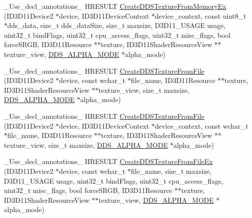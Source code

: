 \begin{DoxyCompactItemize}
\item 
\+\_\+\+Use\+\_\+decl\+\_\+annotations\+\_\+ H\+R\+E\+S\+U\+LT \hyperlink{namespacemage_ad5d3e9d297c74e18a84a3c1d9311e6a9}{Create\+D\+D\+S\+Texture\+From\+Memory\+Ex} (I\+D3\+D11\+Device2 $\ast$device, I\+D3\+D11\+Device\+Context $\ast$device\+\_\+context, const uint8\+\_\+t $\ast$dds\+\_\+data, size\+\_\+t dds\+\_\+data\+Size, size\+\_\+t maxsize, D3\+D11\+\_\+\+U\+S\+A\+GE usage, uint32\+\_\+t bind\+Flags, uint32\+\_\+t cpu\+\_\+access\+\_\+flags, uint32\+\_\+t misc\+\_\+flags, bool force\+S\+R\+GB, I\+D3\+D11\+Resource $\ast$$\ast$texture, I\+D3\+D11\+Shader\+Resource\+View $\ast$$\ast$texture\+\_\+view, \hyperlink{namespacemage_a0c586a2bad862f4858900ca121ca80c2}{D\+D\+S\+\_\+\+A\+L\+P\+H\+A\+\_\+\+M\+O\+DE} $\ast$alpha\+\_\+mode)
\item 
\+\_\+\+Use\+\_\+decl\+\_\+annotations\+\_\+ H\+R\+E\+S\+U\+LT \hyperlink{namespacemage_a3a3965b1c7679947007304baf7ba0cde}{Create\+D\+D\+S\+Texture\+From\+File} (I\+D3\+D11\+Device2 $\ast$device, const wchar\+\_\+t $\ast$file\+\_\+name, I\+D3\+D11\+Resource $\ast$$\ast$texture, I\+D3\+D11\+Shader\+Resource\+View $\ast$$\ast$texture\+\_\+view, size\+\_\+t maxsize, \hyperlink{namespacemage_a0c586a2bad862f4858900ca121ca80c2}{D\+D\+S\+\_\+\+A\+L\+P\+H\+A\+\_\+\+M\+O\+DE} $\ast$alpha\+\_\+mode)
\item 
\+\_\+\+Use\+\_\+decl\+\_\+annotations\+\_\+ H\+R\+E\+S\+U\+LT \hyperlink{namespacemage_a6385bd66f00f588eb7735234edd95f1e}{Create\+D\+D\+S\+Texture\+From\+File} (I\+D3\+D11\+Device2 $\ast$device, I\+D3\+D11\+Device\+Context $\ast$device\+\_\+context, const wchar\+\_\+t $\ast$file\+\_\+name, I\+D3\+D11\+Resource $\ast$$\ast$texture, I\+D3\+D11\+Shader\+Resource\+View $\ast$$\ast$texture\+\_\+view, size\+\_\+t maxsize, \hyperlink{namespacemage_a0c586a2bad862f4858900ca121ca80c2}{D\+D\+S\+\_\+\+A\+L\+P\+H\+A\+\_\+\+M\+O\+DE} $\ast$alpha\+\_\+mode)
\item 
\+\_\+\+Use\+\_\+decl\+\_\+annotations\+\_\+ H\+R\+E\+S\+U\+LT \hyperlink{namespacemage_aca15cd1804aa3b23b806a44c31019db8}{Create\+D\+D\+S\+Texture\+From\+File\+Ex} (I\+D3\+D11\+Device2 $\ast$device, const wchar\+\_\+t $\ast$file\+\_\+name, size\+\_\+t maxsize, D3\+D11\+\_\+\+U\+S\+A\+GE usage, uint32\+\_\+t bind\+Flags, uint32\+\_\+t cpu\+\_\+access\+\_\+flags, uint32\+\_\+t misc\+\_\+flags, bool force\+S\+R\+GB, I\+D3\+D11\+Resource $\ast$$\ast$texture, I\+D3\+D11\+Shader\+Resource\+View $\ast$$\ast$texture\+\_\+view, \hyperlink{namespacemage_a0c586a2bad862f4858900ca121ca80c2}{D\+D\+S\+\_\+\+A\+L\+P\+H\+A\+\_\+\+M\+O\+DE} $\ast$alpha\+\_\+mode)

\end{DoxyCompactItemize}
